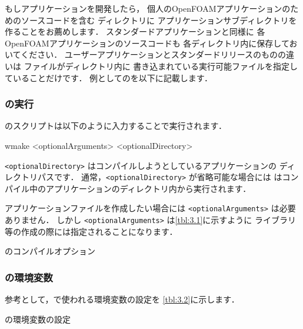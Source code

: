 もしアプリケーションを開発したら，
個人のOpenFOAMアプリケーションのためのソースコードを含む
ディレクトリに
アプリケーションサブディレクトリを作ることをお薦めします．
スタンダードアプリケーションと同様に
各OpenFOAMアプリケーションのソースコードも
各ディレクトリ内に保存しておいてください．
ユーザーアプリケーションとスタンダードリリースのものの違いは
ファイルがディレクトリ内に
書き込まれている実行可能ファイルを指定していることだけです．
例としてのを以下に記載します．

\subsubsection{の実行}
\label{sssec:3.2.2.4}
のスクリプトは以下のように入力することで実行されます．
\begin{OFverbatim}[terminal]
wmake <optionalArguments> <optionalDirectory>
\end{OFverbatim}
\texttt{<optionalDirectory>} はコンパイルしようとしているアプリケーションの
ディレクトリパスです．
通常，\texttt{<optionalDirectory>} が省略可能な場合には
はコンパイル中のアプリケーションのディレクトリ内から実行されます．


アプリケーションファイルを作成したい場合には \texttt{<optionalArguments>} は必要ありません．
しかし \texttt{<optionalArguments>} は\autoref{tbl:3.1}に示すように
ライブラリ等の作成の際には指定されることになります．


\begin{table}[ht]
 
 \caption{のコンパイルオプション}
 \label{tbl:3.1}
\end{table}


\subsubsection{の環境変数}
\label{sssec:3.2.2.5}
参考として，で使われる環境変数の設定を
\autoref{tbl:3.2}に示します．


\begin{table}[ht]
 
 \caption{の環境変数の設定}
 \label{tbl:3.2}
\end{table}


